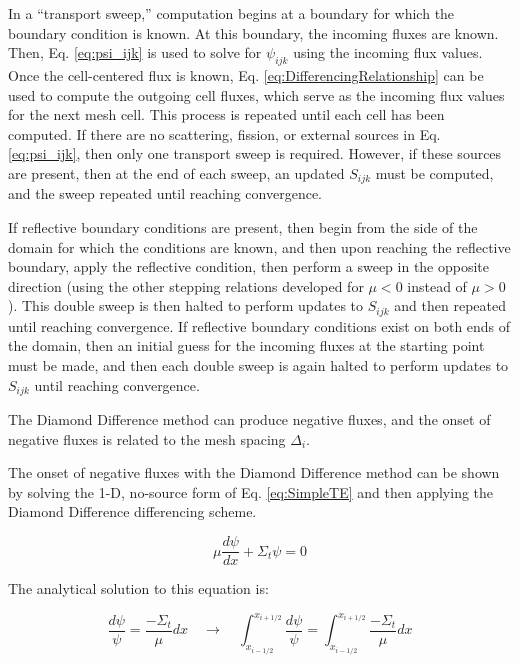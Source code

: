 \documentclass[10pt]{article}
\begin{document}
\begin{flushleft}
In a ``transport sweep,'' computation begins at a boundary for which the boundary condition is known. At this boundary, the incoming fluxes are known. Then, Eq. \eqref{eq:psi_ijk} is used to solve for \(\psi_{ijk}\) using the incoming flux values. Once the cell-centered flux is known, Eq. \eqref{eq:DifferencingRelationship} can be used to compute the outgoing cell fluxes, which serve as the incoming flux values for the next mesh cell. This process is repeated until each cell has been computed. If there are no scattering, fission, or external sources in Eq. \eqref{eq:psi_ijk}, then only one transport sweep is required. However, if these sources are present, then at the end of each sweep, an updated \(S_{ijk}\) must be computed, and the sweep repeated until reaching convergence. 

If reflective boundary conditions are present, then begin from the side of the domain for which the conditions are known, and then upon reaching the reflective boundary, apply the reflective condition, then perform a sweep in the opposite direction (using the other stepping relations developed for \(\mu<0\) instead of \(\mu>0\)). This double sweep is then halted to perform updates to \(S_{ijk}\) and then repeated until reaching convergence. If reflective boundary conditions exist on both ends of the domain, then an initial guess for the incoming fluxes at the starting point must be made, and then each double sweep is again halted to perform updates to \(S_{ijk}\) until reaching convergence. 

The Diamond Difference method can produce negative fluxes, and the onset of negative fluxes is related to the mesh spacing \(\Delta_i\). 

\begin{tcolorbox}[breakable]
The onset of negative fluxes with the Diamond Difference method can be shown by solving the 1-D, no-source form of Eq. \eqref{eq:SimpleTE} and then applying the Diamond Difference differencing scheme.

\begin{equation}
\label{eq:Ex2}
\mu\frac{d\psi}{dx}+\Sigma_t\psi=0
\end{equation}

The analytical solution to this equation is:

\begin{equation}
\frac{d\psi}{\psi}=\frac{-\Sigma_t}{\mu}dx\quad\rightarrow\quad\int_{x_{i-1/2}}^{x_{i+1/2}}\frac{d\psi}{\psi}=\int_{x_{i-1/2}}^{x_{i+1/2}}\frac{-\Sigma_t}{\mu}dx
\end{equation}


\end{tcolorbox}
\end{flushleft}
\end{document}
